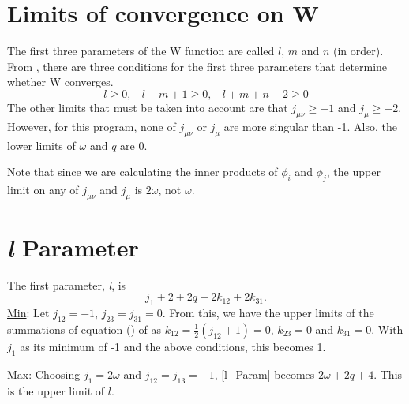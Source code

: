 \documentclass[Dissertation.tex]{subfiles}
\begin{document}
\section{Limits of convergence on W}

The first three parameters of the W function are called $l$, $m$ and $n$
(in order). From \cite{Drake1995}, there are three conditions for the first
three parameters that determine whether W converges.
\[l \geq 0, ~~~~ l+m+1 \geq 0, ~~~~ l+m+n+2 \geq 0\]
The other limits that must be taken into account are that $j_{\mu \nu} \geq -1$
and $j_{\mu} \geq -2$. However, for this program, none of $j_{\mu \nu}$ or
$j_{\mu}$ are more singular than -1.  Also, the lower limits of $\omega$ and
$q$ are 0.

Note that since we are calculating the inner products of $\phi_i$ and $\phi_j$,
the upper limit on any of $j_{\mu \nu}$ and $j_{\mu}$ is $2\omega$, not
$\omega$.

\section{\emph{l} Parameter}
The first parameter, \emph{l}, is
\begin{equation}
	\label{l_Param}j_1 + 2 + 2q + 2 k_{12} + 2 k_{31}.
\end{equation}
\underline{Min}: Let $j_{12} = -1$, $j_{23} = j_{31} = 0$.  From this, we 
have the upper limits of the summations of equation () of \cite{Drake1995} as 
$k_{12} = \tfrac{1}{2} (j_{12} + 1) = 0$, $k_{23} = 0$ and $k_{31} = 0$. With 
$j_1$ as its minimum of -1 and the above conditions, this becomes 1.

\noindent\underline{Max}: Choosing $j_1 = 2 \omega$ and $j_{12} = j_{13} = -1$, \cref{l_Param} becomes $2 \omega + 2q + 4$.  This is the upper limit of $l$.
\end{document}
